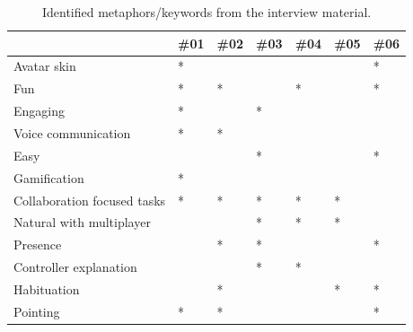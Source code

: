\begin{table}[!h]
\centering
\begin{tabular}{l|llllll}
                            & \#01 &\#02 &\#03 &\#04 & \#05 & \#06 \\ \hline 
Avatar skin                 & *        &          &          &          &          & *        \\ 
Fun                         & *        & *        &          & *        &          & *        \\ 
Engaging                    & *        &          & *        &          &          &          \\ 
Voice communication         & *        & *        &          &          &          &          \\ 
Easy                        &          &          & *        &          &          & *        \\ 
Gamification                & *        &          &          &          &          &          \\ 
Collaboration focused tasks & *        & *        & *        & *        & *        &          \\ 
Natural with multiplayer    &          &          & *        & *        & *        &          \\ 
Presence                    &          & *        & *        &          &          & *        \\ 
Controller explanation      &          &          & *        & *        &          &          \\ 
Habituation                 &          & *        &          &          & *        & *        \\ 
Pointing                    & *        & *        &          &          &          & *        \\ 
\end{tabular}

\caption{Identified metaphors/keywords from the interview material.}
\label{table:methaphorsInterview1}
\end{table}


